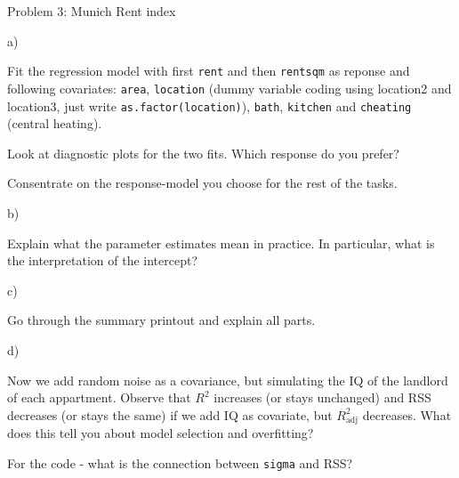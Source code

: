 \documentclass[ignorenonframetext,]{beamer}
\begin{document}
\begin{frame}[fragile]

\begin{block}{Problem 3: Munich Rent index}

\begin{block}{a)}

Fit the regression model with first \texttt{rent} and then
\texttt{rentsqm} as reponse and following covariates: \texttt{area},
\texttt{location} (dummy variable coding using location2 and location3,
just write \texttt{as.factor(location)}), \texttt{bath},
\texttt{kitchen} and \texttt{cheating} (central heating).

Look at diagnostic plots for the two fits. Which response do you prefer?

Consentrate on the response-model you choose for the rest of the tasks.

\end{block}

\begin{block}{b)}

Explain what the parameter estimates mean in practice. In particular,
what is the interpretation of the intercept?

\end{block}

\begin{block}{c)}

Go through the summary printout and explain all parts.

\end{block}

\begin{block}{d)}

Now we add random noise as a covariance, but simulating the IQ of the
landlord of each appartment. Observe that \(R^2\) increases (or stays
unchanged) and RSS decreases (or stays the same) if we add IQ as
covariate, but \(R^2_{\text{adj}}\) decreases. What does this tell you
about model selection and overfitting?

For the code - what is the connection between \texttt{sigma} and RSS?


\end{block}
\end{block}
\end{frame}
\end{document}
